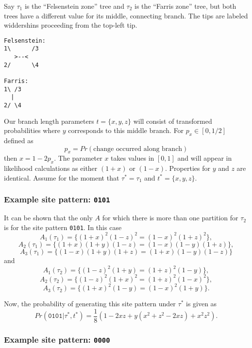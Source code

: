 
Say $\tau_1$ is the ``Felsenstein zone'' tree and $\tau_2$ is the ``Farris zone'' tree, but both trees have a different value for its middle, connecting branch.
The tips are labeled widdershins proceeding from the top-left tip.
\begin{verbatim}
Felsenstein:
1\      /3
   >--< 
2/      \4

Farris:
1\ /3
  | 
2/ \4
\end{verbatim}
Our branch length parameters $t=\{x,y,z\}$ will consist of transformed probabilities where $y$ corresponds to this middle branch.
For $p_x\in[0,1/2]$ defined as
$$p_x = Pr(\mbox{change occurred along branch})$$
then $x = 1-2p_x$.
The parameter $x$ takes values in $[0,1]$ and will appear in likelihood calculations as either $(1+x)$ or $(1-x)$.
Properties for $y$ and $z$ are identical.
Assume for the moment that $\tau^*=\tau_1$ and $t^*=\{x,y,z\}$.

\subsubsection{Example site pattern: \texttt{0101}}

It can be shown that the only $A$ for which there is more than one partition for $\tau_2$ is for the site pattern \texttt{0101}.
In this case
$$A_1(\tau_1) = \{(1+x)^2(1-z)^2 = (1-x)^2(1+z)^2\},$$
$$A_2(\tau_1) = \{(1+x)(1+y)(1-z) = (1-x)(1-y)(1+z)\},$$
$$A_3(\tau_1) = \{(1-x)(1+y)(1+z) = (1+x)(1-y)(1-z)\}$$
and
$$A_1(\tau_2) = \{(1-z)^2(1+y) = (1+z)^2(1-y)\},$$
$$A_2(\tau_2) = \{(1-z)^2(1+x)^2 = (1+z)^2(1-x)^2\},$$
$$A_3(\tau_2) = \{(1+x)^2(1-y) = (1-x)^2(1+y)\}.$$

Now, the probability of generating this site pattern under $\tau^*$ is given as
$$
Pr(\texttt{0101} | \tau^*, t^*) = \frac{1}{8}(1-2xz+y(x^2+z^2-2xz)+x^2z^2).
$$

\subsubsection{Example site pattern: \texttt{0000}}

